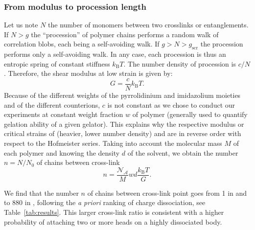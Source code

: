 \documentclass[journal=jacsat,manuscript=article]{achemso}
\begin{document}
\subsubsection{From modulus to procession length}

Let us note $N$ the number of monomers between two crosslinks or entanglements. If $N>g$ the ``procession'' of polymer chains performs a random walk of correlation blobs, each being a self-avoiding walk. If $g>N>g_\mathrm{scr}$ the procession performs only a self-avoiding walk. In any case, each procession is thus an entropic spring of constant stiffness $k_\mathrm{B}T$. The number density of procession is $c/N$. Therefore, the shear modulus at low strain is given by:
\begin{equation}
G = \frac{c}{N}k_\mathrm{B}T.
\label{eq:G}
\end{equation}
Because of the different weights of the pyrrolidinium and imidazolium moieties and of the different counterions, $c$ is not constant as we chose to conduct our experiments at constant weight fraction $w$ of polymer (generally used to quantify gelation ability of a given gelator). This explains why the respective modulus or critical strains of  (heavier, lower number density) and  are in reverse order with respect to the Hofmeister series. Taking into account the molecular mass $M$ of each polymer and  knowing the density $d$ of the solvent, we obtain the number $n = N/N_0$ of chains between cross-link
\begin{equation}
n = \frac{\mathcal{N_A}}{M} w d \frac{k_\mathrm{B}T}{G}.
\label{eq:n}
\end{equation}

We find that the number $n$ of chains between cross-link point goes from 1 in  and  to 880 in , following the \textit{a priori} ranking of charge dissociation, see Table~\ref{tab:results}. This larger cross-link ratio is consistent with a higher probability of attaching two or more heads on a highly dissociated body.
\end{document}
